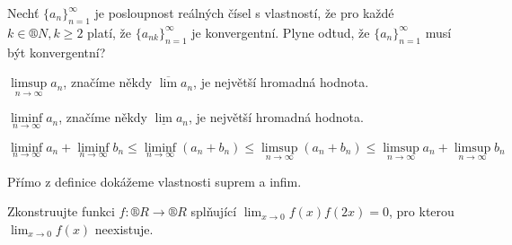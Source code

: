 \documentclass[12pt]{article}					%
\begin{document}
    \begin{priklad}
        Nechť $\{a_n\}_{n = 1}^∞$ je posloupnost reálných čísel s vlastností, že pro každé $k \in ®N, k≥2$ platí, že $\{a_{nk}\}_{n = 1}^∞$ je konvergentní. Plyne odtud, že $\{a_n\}_{n = 1}^∞$ musí být konvergentní?
    \end{priklad}

    \begin{poznamka}[Připomeňme]
        $\limsup\limits_{n \rightarrow ∞} a_n$, značíme někdy $\overline{\lim} a_n$, je největší hromadná hodnota.

        $\liminf\limits_{n \rightarrow ∞} a_n$, značíme někdy $\underline{\lim} a_n$, je největší hromadná hodnota.
    \end{poznamka}

    \begin{tvrzeni}
        $$ \liminf\limits_{n \rightarrow ∞} a_n + \liminf\limits_{n \rightarrow ∞}b_n ≤ \liminf\limits_{n \rightarrow ∞} (a_n + b_n) ≤ \limsup\limits_{n \rightarrow ∞} (a_n + b_n) ≤ \limsup\limits_{n \rightarrow ∞} a_n + \limsup\limits_{n \rightarrow ∞} b_n $$
        \begin{dukazin}
            Přímo z definice dokážeme vlastnosti suprem a infim.
        \end{dukazin}
    \end{tvrzeni}


    \begin{priklad}
            Zkonstruujte funkci $f: ®R \rightarrow ®R$ splňující $\lim_{x \rightarrow 0} f(x)f(2x) = 0$, pro kterou $\lim_{x \rightarrow 0} f(x)$ neexistuje.
    \end{priklad}

    
\end{document}
